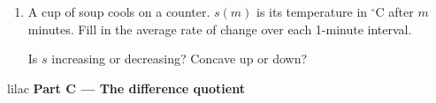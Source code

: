 \documentclass[10pt]{article}
\begin{document}
\begin{enumerate}[leftmargin=1.9em, itemsep=6pt, start=5]
\item A cup of soup cools on a counter. $s(m)$ is its temperature in $^\circ$C after $m$
      minutes. Fill in the average rate of change over each 1-minute interval.

      \par{}
      \vspace{3pt}
      Is $s$ increasing or decreasing?  \qquad Concave up or down? 

\end{enumerate}

\newpage

\begin{headlinebox}{lilac}
\textbf{\color{plum}Part C --- The difference quotient}
\end{headlinebox}
\end{document}
